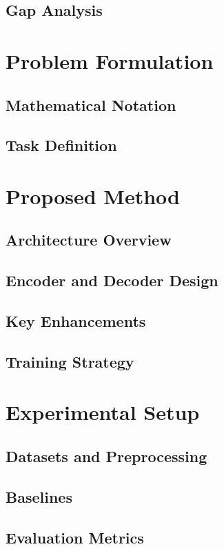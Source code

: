 \documentclass[sigconf]{acmart}
\begin{document}
\subsection{Gap Analysis}

\section{Problem Formulation}
\subsection{Mathematical Notation}
\subsection{Task Definition}

\section{Proposed Method}
\label{sec:method}
\subsection{Architecture Overview}
\subsection{Encoder and Decoder Design}
\subsection{Key Enhancements}
\subsection{Training Strategy}

\section{Experimental Setup}
\label{sec:experiments}
\subsection{Datasets and Preprocessing}
\subsection{Baselines}
\subsection{Evaluation Metrics}
\end{document}
